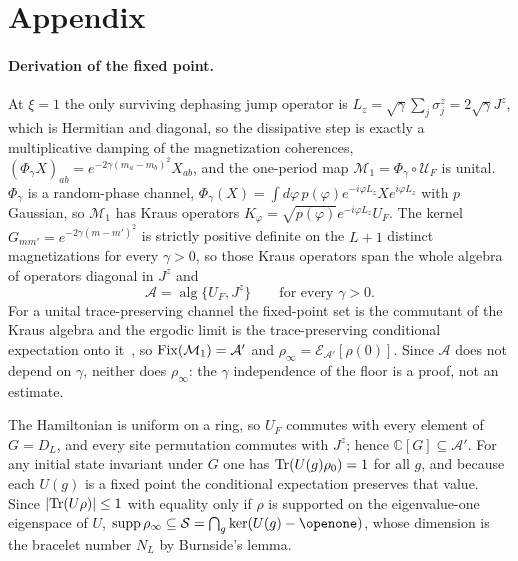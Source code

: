 \documentclass[aps,prl,reprint,amsmath,amssymb,floatfix]{revtex4-2}
\begin{document}



\clearpage
\section*{Appendix}

\paragraph*{Derivation of the fixed point.}
At $\xi=1$ the only surviving dephasing jump operator is
$L_z=\sqrt{\gamma}\sum_j\sigma^z_j=2\sqrt{\gamma}J^z$, which is Hermitian and
diagonal, so the dissipative step is exactly a multiplicative damping of the
magnetization coherences,
$(\Phi_\gamma X)_{ab}=e^{-2\gamma(m_a-m_b)^2}X_{ab}$, and the one-period map
$\mathcal M_1=\Phi_\gamma\circ\mathcal U_F$ is unital. $\Phi_\gamma$ is a
random-phase channel,
$\Phi_\gamma(X)=\int d\varphi\,p(\varphi)e^{-i\varphi L_z}Xe^{i\varphi L_z}$
with $p$ Gaussian, so $\mathcal M_1$ has Kraus operators
$K_\varphi=\sqrt{p(\varphi)}e^{-i\varphi L_z}U_F$. The kernel
$G_{mm'}=e^{-2\gamma(m-m')^2}$ is strictly positive definite on the $L+1$
distinct magnetizations for every $\gamma>0$, so those Kraus operators span the
whole algebra of operators diagonal in $J^z$ and
\begin{equation}
\label{eq:em_kraus_algebra}
\mathcal A=\operatorname{alg}\{U_F,J^z\}
\qquad\text{for every }\gamma>0 .
\end{equation}
For a unital trace-preserving channel the fixed-point set is the commutant of
the Kraus algebra and the ergodic limit is the trace-preserving conditional
expectation onto it~\cite{Kribs2003,Arias2002}, so
${\rm Fix}(\mathcal M_1)=\mathcal A'$ and
$\rho_\infty=\mathcal E_{\mathcal A'}[\rho(0)]$. Since $\mathcal A$ does not
depend on $\gamma$, neither does $\rho_\infty$: the $\gamma$ independence of
the floor is a proof, not an estimate.

The Hamiltonian is uniform on a ring, so $U_F$ commutes with every element of
$G=D_L$, and every site permutation commutes with $J^z$; hence
$\mathbb C[G]\subseteq\mathcal A'$. For any initial state invariant under $G$
one has $\Tr(U(g)\rho_0)=1$ for all $g$, and because each $U(g)$ is a fixed
point the conditional expectation preserves that value. Since
$\lvert\Tr(U\rho)\rvert\le1$ with equality only if $\rho$ is supported on the
eigenvalue-one eigenspace of $U$,
$\operatorname{supp}\rho_\infty\subseteq\mathcal S=\bigcap_g\ker(U(g)-\openone)$,
whose dimension is the bracelet number $N_L$ by Burnside's lemma.
\end{document}
